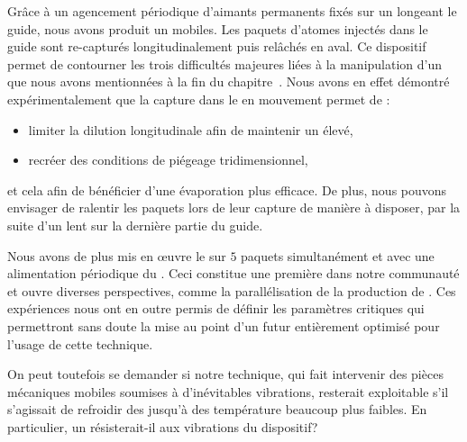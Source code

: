 Grâce à un agencement périodique d'aimants permanents fixés sur un \conv longeant le guide, nous avons produit un \tpIP mobiles. Les paquets d'atomes injectés dans le guide sont re-capturés longitudinalement puis relâchés  en aval. Ce dispositif permet de contourner les trois difficultés majeures liées à la manipulation d'un \jatuf 
que nous avons mentionnées à la fin du chapitre~. 
Nous avons en effet démontré expérimentalement que la capture dans le \tp en mouvement permet de :
\begin{itemize}
	\item limiter la dilution longitudinale afin de maintenir un \tcolel élevé,
	\item recréer des conditions de piégeage tridimensionnel, 
\end{itemize} 
et cela afin de bénéficier d'une évaporation plus efficace. De plus, nous pouvons envisager de ralentir les paquets lors de leur capture de manière à disposer, par la suite d'un \jat lent sur la dernière partie du guide.

Nous avons de plus mis en \oe uvre le \rpef sur $5$ paquets simultanément et avec une alimentation périodique du \tp. Ceci constitue une première dans notre communauté et ouvre diverses perspectives, comme la parallélisation de la production de \becs. 
Ces expériences nous ont  en outre permis de définir les paramètres critiques qui permettront sans doute la mise au point d'un futur \setup entièrement optimisé pour l'usage de cette technique. 


On peut toutefois se demander si notre technique, qui fait intervenir des pièces mécaniques mobiles soumises à d'inévitables vibrations, resterait exploitable s'il s'agissait de refroidir des \pats jusqu'à des température beaucoup plus faibles. 
En particulier, un \bec résisterait-il aux vibrations du dispositif?


